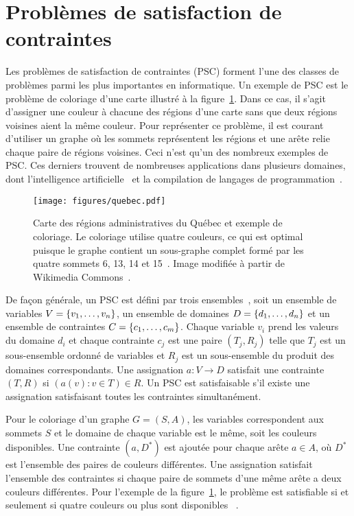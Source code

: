 \section{Problèmes de satisfaction de contraintes}
\label{sec:csp}

Les problèmes de satisfaction de contraintes (PSC)
forment l'une des classes de problèmes parmi les plus importantes en informatique.
Un exemple de PSC est le problème de coloriage d'une carte illustré à la figure~\ref{fig:quebec}.
Dans ce cas,
il s'agit d'assigner une couleur à chacune des régions d'une carte sans que deux régions voisines 
aient la même couleur.
Pour représenter ce problème,
il est courant d'utiliser un graphe où les sommets représentent les régions et une arête relie
chaque paire de régions voisines.
Ceci n'est qu'un des nombreux exemples de PSC.
Ces derniers trouvent de nombreuses applications dans plusieurs domaines,
dont l'intelligence artificielle~\cite{russel_artificial_nodate}
et la compilation de langages de programmation~\cite{aho_compilers_2006}.

\begin{figure}
  \begin{center}
    \texttt{[image: figures/quebec.pdf]}
  \end{center}
  \caption[Exemple du problème de coloriage d'une carte]{
    Carte des régions administratives du Québec et exemple de coloriage. 
    Le coloriage utilise quatre couleurs,
    ce qui est optimal puisque le graphe contient un sous-graphe complet
    formé par les quatre sommets 6, 13, 14 et 15~\cite{kubale_graph_2004}.
    Image modifiée à partir de Wikimedia Commons~\cite{noauthor_carte_2016}.
  }
  \label{fig:quebec}
\end{figure}

De façon générale,
un PSC est défini par trois ensembles~\cite{lecoutre_constraint_2009},
soit un ensemble de variables $V = \qty{v_1, \ldots, v_n}$,
un ensemble de domaines $D = \qty{d_1, \ldots, d_n}$
et un ensemble de contraintes $C = \qty{c_1, \ldots, c_m}$.
Chaque variable $v_i$ prend les valeurs du domaine $d_i$
et chaque contrainte $c_j$ est une paire $(T_j, R_j)$
telle que $T_j$ est un sous-ensemble ordonné de variables et $R_j$
est un sous-ensemble du produit des domaines correspondants.
Une assignation $a: V \to D$ satisfait une contrainte $(T, R)$ 
si $(a(v) : v \in T) \in R$.
Un PSC est satisfaisable s'il existe une assignation 
satisfaisant toutes les contraintes simultanément.

Pour le coloriage d'un graphe $G = (S, A)$,
les variables correspondent aux sommets $S$
et le domaine de chaque variable est le même,
soit les couleurs disponibles.
Une contrainte $(a, D^*)$ est ajoutée pour chaque arête $a \in A$,
où $D^*$ est l'ensemble des paires de couleurs différentes.
Une assignation satisfait l'ensemble des contraintes 
si chaque paire de sommets d'une même arête a deux couleurs différentes.
Pour l'exemple de la figure~\ref{fig:quebec},
le problème est satisfiable si et seulement si quatre couleurs 
ou plus sont disponibles ~\cite{kubale_graph_2004}.


